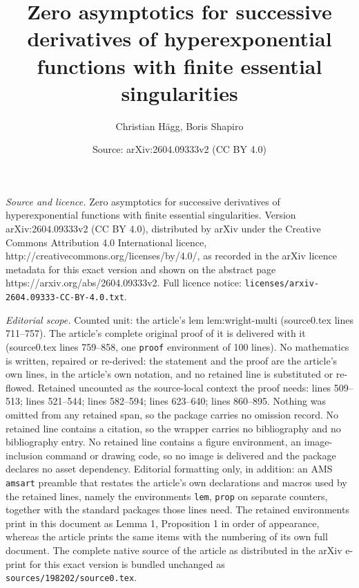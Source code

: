 \documentclass[10pt,a4paper]{amsart}
\title{Zero asymptotics for successive derivatives of hyperexponential functions with finite essential singularities}
\author{Christian H\"agg, Boris Shapiro}
\date{Source: arXiv:2604.09333v2 (CC BY 4.0)}
\begin{document}
\maketitle

\noindent\emph{Source and licence.} Zero asymptotics for successive derivatives of hyperexponential functions with finite essential singularities. Version arXiv:2604.09333v2 (CC BY 4.0), distributed by arXiv under the Creative Commons Attribution 4.0 International licence, http://creativecommons.org/licenses/by/4.0/, as recorded in the arXiv licence metadata for this exact version and shown on the abstract page https://arxiv.org/abs/2604.09333v2. Full licence notice: \texttt{licenses/arxiv-2604.09333-CC-BY-4.0.txt}.\par\smallskip

\noindent\textit{Editorial scope.} Counted unit: the article's lem lem:wright-multi (source0.tex lines 711--757). The article's complete original proof of it is delivered with it (source0.tex lines 759--858, one \texttt{proof} environment of 100 lines). No mathematics is written, repaired or re-derived: the statement and the proof are the article's own lines, in the article's own notation, and no retained line is substituted or re-flowed.  Retained uncounted as the source-local context the proof needs: lines 509--513; lines 521--544; lines 582--594; lines 623--640; lines 860--895.  Nothing was omitted from any retained span, so the package carries no omission record.  No retained line contains a citation, so the wrapper carries no bibliography and no bibliography entry.  No retained line contains a figure environment, an image-inclusion command or drawing code, so no image is delivered and the package declares no asset dependency.  Editorial formatting only, in addition: an AMS \texttt{amsart} preamble that restates the article's own declarations and macros used by the retained lines, namely the environments \texttt{lem}, \texttt{prop} on separate counters, together with the standard packages those lines need.  The retained environments print in this document as Lemma 1, Proposition 1 in order of appearance, whereas the article prints the same items with the numbering of its own full document.  The complete native source of the article as distributed in the arXiv e-print for this exact version is bundled unchanged as \texttt{sources/198202/source0.tex}.
\end{document}
